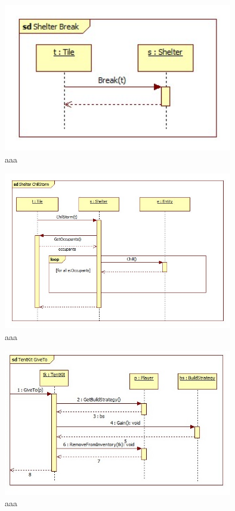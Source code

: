 \begin{figure}[H]
        \begin{center}
                \includegraphics[width=10cm]{chapters/chapter07/seqdiag/Shelter_Break.jpg}
                \caption{aaa}
                \label{bbb}
        \end{center}
\end{figure}
\begin{figure}[H]
        \begin{center}
                \includegraphics[width=10cm]{chapters/chapter07/seqdiag/Shelter_ChillStorm.jpg}
                \caption{aaa}
                \label{bbb}
        \end{center}
\end{figure}
\begin{figure}[H]
        \begin{center}
                \includegraphics[width=10cm]{chapters/chapter07/seqdiag/TentKit_GiveTo.jpg}
                \caption{aaa}
                \label{bbb}
        \end{center}
\end{figure}
